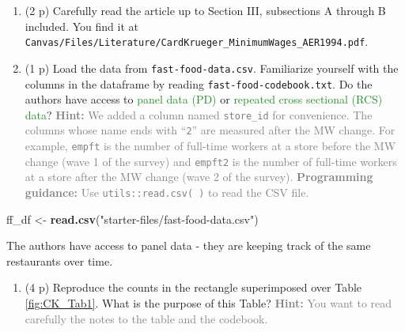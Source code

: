 \documentclass[
]{article}
\newenvironment{Shaded}{\begin{snugshade}}{\end{snugshade}}
\newcommand{\FunctionTok}[1]{\textcolor[rgb]{0.13,0.29,0.53}{\textbf{#1}}}
\newcommand{\NormalTok}[1]{#1}
\newcommand{\OtherTok}[1]{\textcolor[rgb]{0.56,0.35,0.01}{#1}}
\newcommand{\StringTok}[1]{\textcolor[rgb]{0.31,0.60,0.02}{#1}}
\providecommand{\tightlist}{%
  \setlength{\itemsep}{0pt}\setlength{\parskip}{0pt}}
\begin{document}
\begin{enumerate}
\def\labelenumi{\arabic{enumi}.}
\setcounter{enumi}{8}
\item
  (2 p) Carefully read the article up to Section III, subsections A
  through B included. You find it at
  \newline \texttt{Canvas/Files/Literature/CardKrueger\_MinimumWages\_AER1994.pdf}.
\item
  (1 p) Load the data from \texttt{fast-food-data.csv}. Familiarize
  yourself with the columns in the dataframe by reading
  \texttt{fast-food-codebook.txt}. Do the authors have access to
  \textcolor{ForestGreen}{panel data (PD)} or
  \textcolor{ForestGreen}{repeated cross sectional (RCS) data}?
  \textcolor{gray}{\textbf{Hint:} We added a column named \texttt{store\_id} for convenience. The columns whose name ends with ``\texttt{2}'' are measured after the MW change. For example, \texttt{empft} is the number of full-time workers at a store before the MW change (wave 1 of the survey) and \texttt{empft2} is the number of full-time workers at a store after the MW change (wave 2 of the survey).}
  \textcolor{gray}{\textbf{Programming guidance:} Use \texttt{utils::read.csv( )} to read the CSV file.}
\end{enumerate}

\begin{Shaded}
\begin{Highlighting}[]
\NormalTok{ff\_df }\OtherTok{\textless{}{-}} \FunctionTok{read.csv}\NormalTok{(}\StringTok{"starter{-}files/fast{-}food{-}data.csv"}\NormalTok{)}
\end{Highlighting}
\end{Shaded}

The authors have access to panel data - they are keeping track of the
same restaurants over time.

\begin{enumerate}
\def\labelenumi{\arabic{enumi}.}
\setcounter{enumi}{10}
\tightlist
\item
  (4 p) Reproduce the counts in the rectangle superimposed over Table
  \ref{fig:CK_Tab1}. What is the purpose of this Table?
  \textcolor{gray}{\textbf{Hint:} You want to read carefully the notes to the table and the codebook.}
\end{enumerate}
\end{document}
